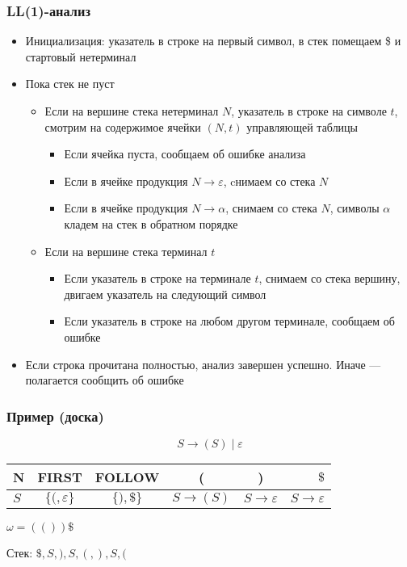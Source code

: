 \documentclass{beamer}
\begin{document}
\begin{frame}[fragile]
  \transwipe[direction=90]
  \frametitle{LL(1)-анализ}
\begin{itemize}
  \item Инициализация: указатель в строке на первый символ, в стек помещаем \$ и стартовый нетерминал
  \item Пока стек не пуст
  \begin{itemize}
    \item Если на вершине стека нетерминал $N$, указатель в строке на символе $t$, смотрим на содержимое ячейки $(N,t)$ управляющей таблицы
    \begin{itemize}
      \item Если ячейка пуста, сообщаем об ошибке анализа
      \item Если в ячейке продукция $N \to \varepsilon$, cнимаем со стека $N$
      \item Если в ячейке продукция $N \to \alpha$, снимаем со стека $N$, символы $\alpha$ кладем на стек в обратном порядке
    \end{itemize}
    \item Если на вершине стека терминал $t$
    \begin{itemize}
      \item Если указатель в строке на терминале $t$, снимаем со стека вершину, двигаем указатель на следующий символ
      \item Если указатель в строке на любом другом терминале, сообщаем об ошибке
    \end{itemize}
  \end{itemize}
  
  \item Если строка прочитана полностью, анализ завершен успешно.
  Иначе — полагается сообщить об ошибке
\end{itemize}
\end{frame}

\begin{frame}[fragile]
  \transwipe[direction=90]
  \frametitle{Пример (доска)}
  \[
  S \to ( S ) \mid \varepsilon
  \]   

\begin{center}
\begin{tabular}{ l || c | c || c | c | r }
  N & FIRST & FOLLOW & ( & ) & $\$ $ \\ \hline  
  $S$ & $\{ (, \varepsilon \}$ & $\{ ), \$ \}$ & $S \to (S)$ & $S \to \varepsilon$ & $S \to \varepsilon$ 
\end{tabular}  
\end{center}

$\omega = (()) \$ $

Стек: $\$, S, ), S, (, ), S, ($ 
\end{frame}  
\end{document}
